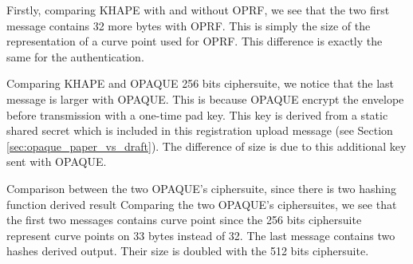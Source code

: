 \documentclass[../report.tex]{subfiles}
\begin{document}
Firstly, comparing KHAPE with and without OPRF, we see that the two first message contains 32 more bytes with OPRF. This is simply the size of the representation of a curve point used for OPRF. This difference is exactly the same for the authentication.

Comparing KHAPE and OPAQUE 256 bits ciphersuite, we notice that the last message is larger with OPAQUE.
This is because OPAQUE encrypt the envelope before transmission with a one-time pad key.
This key is derived from a static shared secret which is included in this registration upload message (see Section \ref{sec:opaque_paper_vs_draft}). The difference of size is due to this additional key sent with OPAQUE.


Comparison between the two OPAQUE's ciphersuite, since there is two hashing function derived result
Comparing the two OPAQUE's ciphersuites, we see that the first two messages contains curve point since the 256 bits ciphersuite represent curve points on 33 bytes instead of 32.
The last message contains two hashes derived output. Their size is doubled with the 512 bits ciphersuite.



\end{document}
